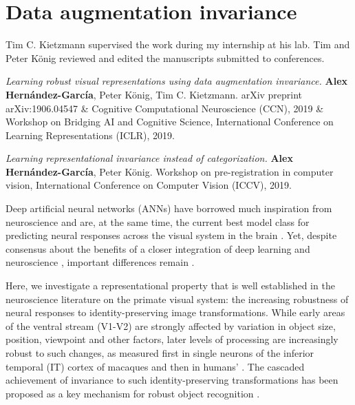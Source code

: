 {
\chapter{Data augmentation invariance}
\label{ch:invariance}
\renewcommand{\chapterpath}{includes/invariance}
%
\begin{contributors}
    Tim C. Kietzmann supervised the work during my internship at his lab. Tim and Peter K{\"o}nig reviewed and edited the manuscripts submitted to conferences.
\end{contributors}
\begin{outreach}
    \item \textit{Learning robust visual representations using data augmentation invariance.} \textbf{Alex Hern{\'a}ndez-Garc{\'i}a}, Peter K{\"o}nig, Tim C. Kietzmann. arXiv preprint arXiv:1906.04547 \& Cognitive Computational Neuroscience (CCN), 2019 \& Workshop on Bridging AI and Cognitive Science, International Conference on Learning Representations (ICLR), 2019.
    \item \textit{Learning representational invariance instead of categorization.} \textbf{Alex Hern{\'a}ndez-Garc{\'i}a}, Peter K{\"o}nig. Workshop on pre-registration in computer vision, International Conference on Computer Vision (ICCV), 2019.
\end{outreach}
%
Deep artificial neural networks (ANNs) have borrowed much inspiration from neuroscience and are, at the same time, the current best model class for predicting neural responses across the visual system in the brain \citep{kietzmann2019dnncompneuro, kubilius2018cornet}. Yet, despite consensus about the benefits of a closer integration of deep learning and neuroscience \citep{bengio2015dlandneuroscience, marblestone2016dlandneuroscience, richards2019dlandneuroscience}, important differences remain \citep{sinz2019dlvsbrain, geirhos2020shortcutlearning, dujmovic2020adversarial}.

Here, we investigate a representational property that is well established in the neuroscience literature on the primate visual system: the increasing robustness of neural responses to identity-preserving image transformations. While early areas of the ventral stream (V1-V2) are strongly affected by variation in object size, position, viewpoint and other factors, later levels of processing are increasingly robust to such changes, as measured first in single neurons of the inferior temporal (IT) cortex of macaques \cite{booth1998invariantitmacaque} and then in humans' \citep{quiroga2005invariantithuman, isik2013dynamics}. The cascaded achievement of invariance to such identity-preserving transformations has been proposed as a key mechanism for robust object recognition \citep{dicarlo2007untangling, tacchetti2018invariance}.

}
